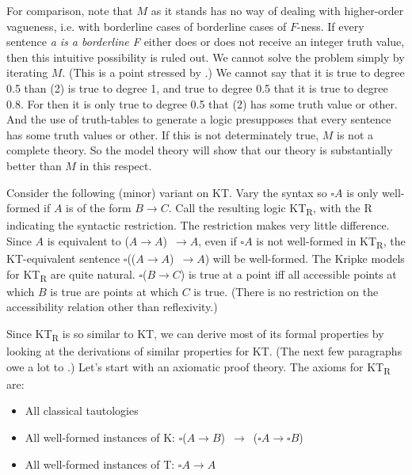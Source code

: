 For comparison, note that \(M\) as it stands has no way of dealing with higher\nobreakdash-order vagueness, i.e. with borderline cases of borderline cases of \(F\){}-ness. If every sentence \textit{a is a borderline F }either does or does not receive an integer truth value, then this intuitive possibility is ruled out. We cannot solve the problem simply by iterating \(M\). (This is a point stressed by \cite[Ch. 4]{Williamson1994-WILV}.) We cannot say that it is true to degree 0.5 than (2) is true to degree 1, and true to degree 0.5 that it is true to degree 0.8. For then it is only true to degree 0.5 that (2) has some truth value or other. And the use of truth-tables to generate a logic presupposes that every sentence has some truth values or other. If this is not determinately true, \(M\) is not a complete theory. So the model theory will show that our theory is substantially better than \(M\) in this respect.

Consider the following (minor) variant on KT. Vary the syntax so \(\square A\) is only well-formed if \(A\) is of the form \(B \rightarrow C\). Call the resulting logic KT\textsubscript{R}, with the R indicating the syntactic restriction. The restriction makes very little difference. Since \(A\) is equivalent to (\(A \rightarrow A\))~\(\rightarrow A\), even if \(\square A\) is not well-formed in KT\textsubscript{R}, the KT-equivalent sentence \(\square\)((\(A \rightarrow A\))~\(\rightarrow A\)) will be well-formed. The Kripke models for KT\textsubscript{R} are quite natural. \(\square\)(\(B \rightarrow C\)) is true at a point iff all accessible points at which \(B\) is true are points at which \(C\) is true. (There is no restriction on the accessibility relation other than reflexivity.)

Since KT\textsubscript{R} is so similar to KT, we can derive most of its formal properties by looking at the derivations of similar properties for KT. (The next few paragraphs owe a lot to \cite[Chs.1-3]{Goldblatt1992}.) Let's start with an axiomatic proof theory. The axioms for KT\textsubscript{R} are:

\begin{itemize}
\item All classical tautologies
\item All well-formed instances of K: \(\square\)(\(A \rightarrow B\))~\(\rightarrow\)~(\(\square A \rightarrow \square B\))
\item All well-formed instances of T: \(\square A \rightarrow A\)
\end{itemize}

